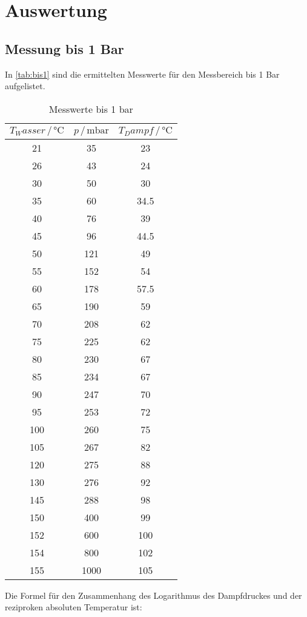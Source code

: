 \section{Auswertung}
\label{sec:Auswertung}
\subsection{Messung bis 1 Bar}
In \autoref{tab:bis1} sind die ermittelten Messwerte für den Messbereich bis 1 Bar aufgelistet.
\begin{table}[H]
  \centering
  \caption{Messwerte bis 1 \si{\bar}}
  \label{tab:bis1}
  \begin{tabular}{ccc}
  \toprule
  $T_Wasser \,/\, \si{\celsius}$ & $p \,/\, \si{\milli\bar}$ & $T_Dampf\,/\, \si{\celsius}$\\
  \midrule
  21  & 35  & 23   \\
  26  & 43  & 24   \\
  30  & 50  & 30   \\
  35  & 60  & 34.5 \\
  40  & 76  & 39   \\
  45  & 96  & 44.5 \\
  50  & 121 & 49   \\
  55  & 152 & 54   \\
  60  & 178 & 57.5 \\
  65  & 190 & 59   \\
  70  & 208 & 62   \\
  75  & 225 & 62   \\
  80  & 230 & 67   \\
  85  & 234 & 67   \\
  90  & 247 & 70   \\
  95  & 253 & 72   \\
  100 & 260 & 75   \\
  105 & 267 & 82   \\
  120 & 275 & 88   \\
  130 & 276 & 92   \\
  145 & 288 & 98  \\ 
  150 &400 &99\\
  152& 600 &100\\
  154 &800 &102\\
  155 &1000 &105 \\  
  \end{tabular} 
\end{table}
\noindent
Die Formel für den Zusammenhang des Logarithmus des Dampfdruckes und der reziproken absoluten Temperatur ist:
